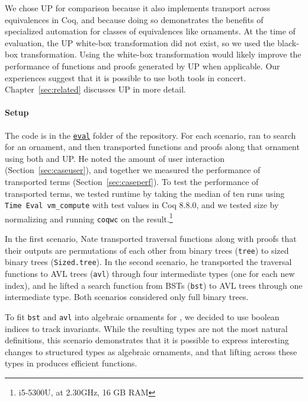 We chose UP for comparison because it also implements transport across equivalences in Coq,
and because doing so demonstrates the benefits of specialized automation for classes of equivalences like ornaments.
At the time of evaluation, the UP white-box transformation did not exist, so we used the black-box transformation.
Using the white-box transformation would likely improve the performance of functions and proofs generated by UP when applicable.
Our experiences suggest that it is possible to use both tools in concert.
Chapter~\ref{sec:related} discusses UP in more detail.

\paragraph{Setup}
The code is in the \href{http://github.com/uwplse/ornamental-search/tree/itp+equiv/plugin/eval}{\lstinline{eval}} folder of the repository.
For each scenario,
 ran \toolnamec to search for an ornament,
and then transported functions and proofs along that ornament using both \toolnamec and UP.
He noted the amount of user interaction (Section~\ref{sec:caseuser}),
and together we measured the performance of transported terms (Section~\ref{sec:caseperf}).
To test the performance of transported terms, we tested runtime by 
taking the median of ten runs using \lstinline{Time Eval vm_compute} with test values in Coq 8.8.0,
and we tested size by normalizing and running \lstinline{coqwc} on the result.\footnote{i5-5300U, at 2.30GHz, 16 GB RAM}

In the first scenario, Nate transported traversal functions along with proofs that their outputs are permutations of each other
from binary trees (\lstinline{tree}) to sized binary trees (\lstinline{Sized.tree}).
In the second scenario, he transported the traversal functions to AVL trees (\lstinline{avl}) through four intermediate
types (one for each new index),
and he lifted a search function from BSTs (\lstinline{bst}) to AVL trees through
one intermediate type. 
Both scenarios considered only full binary trees.

To fit \lstinline{bst} and \lstinline{avl} into algebraic ornaments for \toolnamec,
we decided to use boolean indices to track invariants.
While the resulting types are not the most natural definitions,
this scenario demonstrates that it is possible to express interesting changes to structured types as algebraic ornaments,
and that lifting across these types in \toolnamec produces efficient functions.

